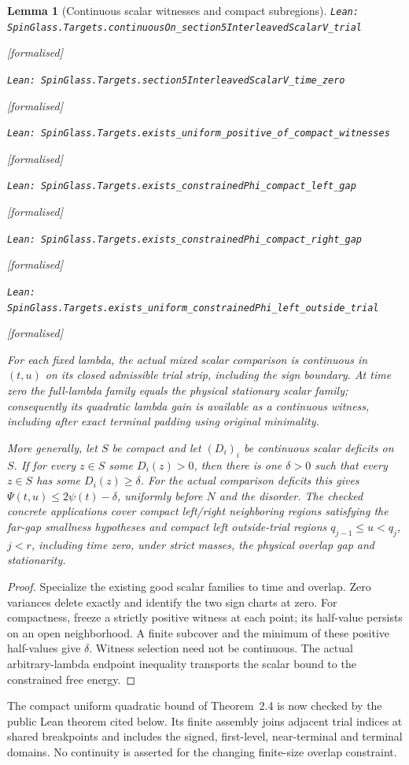 \documentclass[11pt]{article}
\providecommand{\lean}[1]{\leavevmode\par\nopagebreak
  {\noindent\normalfont\footnotesize\raggedright\texttt{Lean: #1}\par}\nopagebreak}
\providecommand{\leanok}{\par\nopagebreak
  {\noindent\normalfont\footnotesize\textcolor{green!50!black}{[formalised]}\par}\nopagebreak}
\newtheorem{lemma}[theorem]{Lemma}
\begin{document}
\begin{lemma}[Continuous scalar witnesses and compact subregions]
\lean{SpinGlass.Targets.continuousOn\_section5InterleavedScalarV\_trial}\leanok
\lean{SpinGlass.Targets.section5InterleavedScalarV\_time\_zero}\leanok
\lean{SpinGlass.Targets.exists\_uniform\_positive\_of\_compact\_witnesses}\leanok
\lean{SpinGlass.Targets.exists\_constrainedPhi\_compact\_left\_gap}\leanok
\lean{SpinGlass.Targets.exists\_constrainedPhi\_compact\_right\_gap}\leanok
\lean{SpinGlass.Targets.exists\_uniform\_constrainedPhi\_left\_outside\_trial}\leanok
For each fixed lambda, the actual mixed scalar comparison is continuous in
$(t,u)$ on its closed admissible trial strip, including the sign boundary.
At time zero the full-lambda family equals the physical stationary scalar
family; consequently its quadratic lambda gain is available as a continuous
witness, including after exact terminal padding using original minimality.

More generally, let $S$ be compact and let $(D_i)_i$ be continuous scalar
deficits on $S$. If for every $z\in S$ some $D_i(z)>0$, then there is one
$\delta>0$ such that every $z\in S$ has some $D_i(z)\ge\delta$.
For the actual comparison deficits this gives
$\Psi(t,u)\le 2\psi(t)-\delta$, uniformly before $N$ and the disorder.
The checked concrete applications cover compact left/right neighboring
regions satisfying the far-gap smallness hypotheses and compact left
outside-trial regions $q_{j-1}\le u<q_j$, $j<r$, including time zero,
under strict masses, the physical overlap gap and stationarity.
\end{lemma}
\begin{proof}
Specialize the existing good scalar families to time and overlap. Zero
variances delete exactly and identify the two sign charts at zero.
For compactness, freeze a strictly positive witness at each point; its
half-value persists on an open neighborhood. A finite subcover and the
minimum of these positive half-values give $\delta$. Witness selection
need not be continuous. The actual arbitrary-lambda endpoint inequality
transports the scalar bound to the constrained free energy.
\end{proof}

The compact uniform quadratic bound of Theorem~2.4 is now checked by the
public Lean theorem cited below. Its finite assembly joins adjacent trial
indices at shared breakpoints and includes the signed, first-level,
near-terminal and terminal domains. No continuity is asserted for the
changing finite-size overlap constraint.
\end{document}
